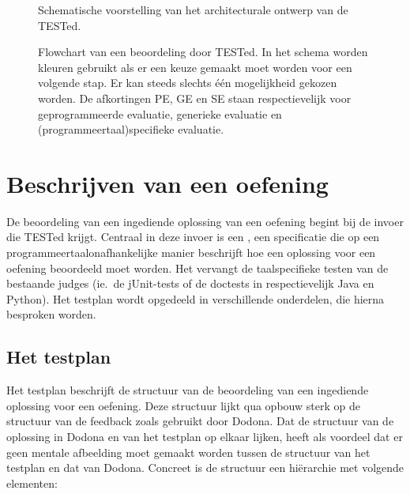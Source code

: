 \begin{figure}
    \centering
    
    \caption{Schematische voorstelling van het architecturale ontwerp van de TESTed.}
    \label{fig:universal-judge}
\end{figure}

\begin{figure}
    \centering
    
    \caption{
        Flowchart van een beoordeling door TESTed.
        In het schema worden kleuren gebruikt als er een keuze gemaakt moet worden voor een volgende stap.
        Er kan steeds slechts één mogelijkheid gekozen worden.
        De afkortingen PE, GE en SE staan respectievelijk voor geprogrammeerde evaluatie, generieke evaluatie en (programmeertaal)specifieke evaluatie.
    }
    \label{fig:tested-flow}
\end{figure}


\section{Beschrijven van een oefening}\label{sec:testplan}

De beoordeling van een ingediende oplossing van een oefening begint bij de invoer die TESTed krijgt.
Centraal in deze invoer is een , een specificatie die op een programmeertaalonafhankelijke manier beschrijft hoe een oplossing voor een oefening beoordeeld moet worden.
Het vervangt de taalspecifieke testen van de bestaande judges (ie.\ de jUnit-tests of de doctests in respectievelijk Java en Python).
Het testplan  wordt opgedeeld in verschillende onderdelen, die hierna besproken worden.

\subsection{Het testplan}\label{subsec:het-testplan}

Het testplan  beschrijft de structuur van de beoordeling van een ingediende oplossing voor een oefening.
Deze structuur lijkt qua opbouw sterk op de structuur van de feedback zoals gebruikt door Dodona.
Dat de structuur van de oplossing in Dodona en van het testplan op elkaar lijken, heeft als voordeel dat er geen mentale afbeelding moet gemaakt worden tussen de structuur van het testplan en dat van Dodona.
Concreet is de structuur een hiërarchie met volgende elementen:


